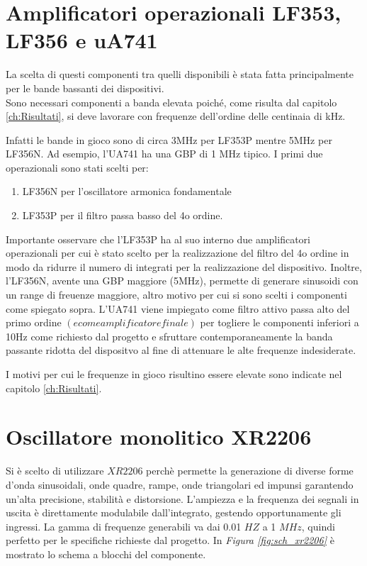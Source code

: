 \documentclass[titlepage]{report}
\begin{document}
	
\section{Amplificatori operazionali LF353, LF356 e uA741}
\label{sec:OpAmp}
	La scelta di questi componenti tra quelli disponibili è stata fatta principalmente per le bande bassanti dei dispositivi.
	\\ Sono necessari componenti a banda elevata poiché, come risulta dal capitolo \ref{ch:Risultati}, si deve lavorare con frequenze dell'ordine delle centinaia di kHz.
	
	 \noindent Infatti le bande in gioco sono di circa 3MHz per LF353P mentre 5MHz per LF356N. Ad esempio, l'UA741 ha una GBP di 1 MHz tipico. I primi due operazionali sono stati scelti per:
	
	\begin{enumerate}
		\item LF356N per l'oscillatore armonica fondamentale 
		\item LF353P per il filtro passa basso del 4o ordine. 
	\end{enumerate}
	
	
	\noindent Importante osservare che l'LF353P ha al suo interno due amplificatori operazionali per cui è stato scelto per la realizzazione del filtro del 4o ordine in modo da ridurre il numero di integrati per la realizzazione del dispositivo. Inoltre, l'LF356N, avente una GBP maggiore (5MHz), permette di generare sinusoidi con un range di freuenze maggiore, altro motivo per cui si sono scelti i componenti come spiegato sopra.
	L'UA741 viene impiegato come filtro attivo passa alto del primo ordine $(e come amplificatore finale)$ per togliere le componenti inferiori a 10Hz come richiesto dal progetto e sfruttare contemporaneamente la banda passante ridotta del dispositvo al fine di attenuare le alte frequenze indesiderate.

	\noindent I motivi per cui le frequenze in gioco risultino essere elevate sono indicate nel capitolo \ref{ch:Risultati}.

	
\section{Oscillatore monolitico XR2206}
	\label{sec:XR2206}
	
	Si è scelto di utilizzare $XR2206$ perchè permette la generazione di diverse forme d'onda sinusoidali, onde quadre, rampe, onde triangolari ed impunsi garantendo un'alta precisione, stabilità e distorsione. L'ampiezza e la frequenza dei segnali in uscita è direttamente modulabile dall'integrato, gestendo opportunamente gli ingressi. La gamma di frequenze generabili va dai 0.01 $HZ$ a 1 $MHz$, quindi perfetto per le specifiche richieste dal progetto. 
	In \textit{Figura \ref{fig:sch_xr2206}} è mostrato lo schema a blocchi del componente.
	
\end{document}
